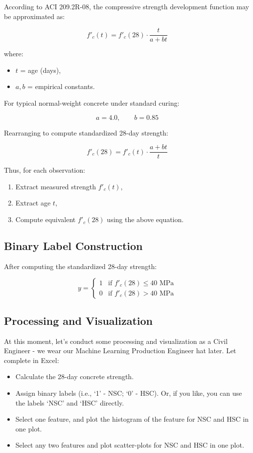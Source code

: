 \documentclass[12pt]{article}
\begin{document}
According to ACI 209.2R-08, the compressive strength development function may be approximated as:

\[
f'_c(t) = f'_c(28) \cdot \frac{t}{a + bt}
\]

where:
\begin{itemize}
    \item $t$ = age (days),
    \item $a, b$ = empirical constants.
\end{itemize}

For typical normal-weight concrete under standard curing:

\[
a = 4.0, \qquad b = 0.85
\]

Rearranging to compute standardized 28-day strength:

\[
f'_c(28) = f'_c(t) \cdot \frac{a + bt}{t}
\]

Thus, for each observation:

\begin{enumerate}
    \item Extract measured strength $f'_c(t)$,
    \item Extract age $t$,
    \item Compute equivalent $f'_c(28)$ using the above equation.
\end{enumerate}

\subsection*{Binary Label Construction}

After computing the standardized 28-day strength:

\[
y =
\begin{cases}
1 & \text{if } f'_c(28) \le 40 \text{ MPa} \\
0 & \text{if } f'_c(28) > 40 \text{ MPa}
\end{cases}
\]

\subsection*{Processing and Visualization}
At this moment, let's conduct some processing and visualization as a Civil Engineer - we wear our Machine Learning Production Engineer hat later. Let complete in Excel:

\begin{itemize}
    \item Calculate the 28-day concrete strength.
    \item Assign binary labels (i.e., `1' - NSC; `0' - HSC). Or, if you like, you can use the labels `NSC' and `HSC' directly.
    \item Select one feature, and plot the histogram of the feature for NSC and HSC in one plot.
    \item Select any two features and plot scatter-plots for NSC and HSC in one plot. 
    \end{itemize}
    
\end{document}
